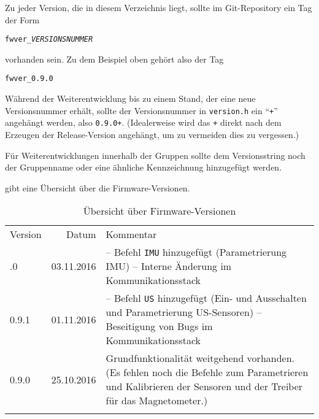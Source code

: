 Zu jeder Version, die in diesem Verzeichnis liegt, sollte im Git-Repository ein Tag der Form
\begin{center}
	\texttt{fwver\_\textit{VERSIONSNUMMER}}
\end{center}
vorhanden sein. Zu dem Beispiel oben gehört also der Tag
\begin{center}
	\texttt{fwver\_0.9.0}
\end{center}

Während der Weiterentwicklung bis zu einem Stand, der eine neue Versionsnummer erhält, sollte der Versionsnummer in \verb|version.h| ein "`\verb|+|"' angehängt werden, also \zB \verb|0.9.0+|. (Idealerweise wird das \verb|+| direkt nach dem Erzeugen der Release-Version angehängt, um zu vermeiden dies zu vergessen.)

Für Weiterentwicklungen innerhalb der Gruppen sollte dem Versionsstring noch der Gruppenname oder eine ähnliche Kennzeichnung hinzugefügt werden.


 gibt eine Übersicht über die Firmware-Versionen.

\begin{table}%
	\centering
	\caption{Übersicht über Firmware-Versionen}
	\label{tab:repo:fw_versions}
	\begin{tabular}{lrp{10cm}}
		\mytoprule
		Version & Datum & Kommentar \\
		\mymidrule
		0.10.0
			& 03.11.2016
			& -- Befehl \verb|IMU| hinzugefügt (Parametrierung IMU) \newline
				-- Interne Änderung im Kommunikationsstack \\
		0.9.1
			& 01.11.2016
			& -- Befehl \verb|US| hinzugefügt (Ein- und Ausschalten und Parametrierung US-Sensoren) \newline
				-- Beseitigung von Bugs im Kommunikationsstack \\
		0.9.0
			& 25.10.2016
			& Grundfunktionalität weitgehend vorhanden. (Es fehlen noch die Befehle zum Parametrieren und Kalibrieren der Sensoren und der Treiber für das Magnetometer.) \\
		\mybottomrule
	\end{tabular}
\end{table}
